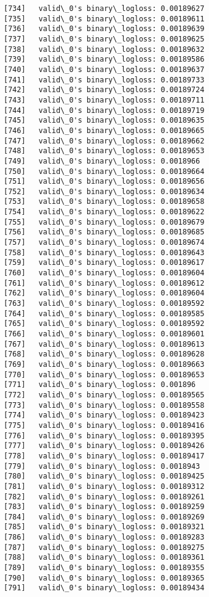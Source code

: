 \documentclass[11pt]{article}
\begin{document}
\begin{Verbatim}[commandchars=\\\{\}]
[734]	valid\_0's binary\_logloss: 0.00189627
[735]	valid\_0's binary\_logloss: 0.00189611
[736]	valid\_0's binary\_logloss: 0.00189639
[737]	valid\_0's binary\_logloss: 0.00189625
[738]	valid\_0's binary\_logloss: 0.00189632
[739]	valid\_0's binary\_logloss: 0.00189586
[740]	valid\_0's binary\_logloss: 0.00189637
[741]	valid\_0's binary\_logloss: 0.00189733
[742]	valid\_0's binary\_logloss: 0.00189724
[743]	valid\_0's binary\_logloss: 0.00189711
[744]	valid\_0's binary\_logloss: 0.00189719
[745]	valid\_0's binary\_logloss: 0.00189635
[746]	valid\_0's binary\_logloss: 0.00189665
[747]	valid\_0's binary\_logloss: 0.00189662
[748]	valid\_0's binary\_logloss: 0.00189653
[749]	valid\_0's binary\_logloss: 0.0018966
[750]	valid\_0's binary\_logloss: 0.00189664
[751]	valid\_0's binary\_logloss: 0.00189656
[752]	valid\_0's binary\_logloss: 0.00189634
[753]	valid\_0's binary\_logloss: 0.00189658
[754]	valid\_0's binary\_logloss: 0.00189622
[755]	valid\_0's binary\_logloss: 0.00189679
[756]	valid\_0's binary\_logloss: 0.00189685
[757]	valid\_0's binary\_logloss: 0.00189674
[758]	valid\_0's binary\_logloss: 0.00189643
[759]	valid\_0's binary\_logloss: 0.00189617
[760]	valid\_0's binary\_logloss: 0.00189604
[761]	valid\_0's binary\_logloss: 0.00189612
[762]	valid\_0's binary\_logloss: 0.00189604
[763]	valid\_0's binary\_logloss: 0.00189592
[764]	valid\_0's binary\_logloss: 0.00189585
[765]	valid\_0's binary\_logloss: 0.00189592
[766]	valid\_0's binary\_logloss: 0.00189601
[767]	valid\_0's binary\_logloss: 0.00189613
[768]	valid\_0's binary\_logloss: 0.00189628
[769]	valid\_0's binary\_logloss: 0.00189663
[770]	valid\_0's binary\_logloss: 0.00189653
[771]	valid\_0's binary\_logloss: 0.001896
[772]	valid\_0's binary\_logloss: 0.00189565
[773]	valid\_0's binary\_logloss: 0.00189558
[774]	valid\_0's binary\_logloss: 0.00189423
[775]	valid\_0's binary\_logloss: 0.00189416
[776]	valid\_0's binary\_logloss: 0.00189395
[777]	valid\_0's binary\_logloss: 0.00189426
[778]	valid\_0's binary\_logloss: 0.00189417
[779]	valid\_0's binary\_logloss: 0.0018943
[780]	valid\_0's binary\_logloss: 0.00189425
[781]	valid\_0's binary\_logloss: 0.00189312
[782]	valid\_0's binary\_logloss: 0.00189261
[783]	valid\_0's binary\_logloss: 0.00189259
[784]	valid\_0's binary\_logloss: 0.00189269
[785]	valid\_0's binary\_logloss: 0.00189321
[786]	valid\_0's binary\_logloss: 0.00189283
[787]	valid\_0's binary\_logloss: 0.00189275
[788]	valid\_0's binary\_logloss: 0.00189361
[789]	valid\_0's binary\_logloss: 0.00189355
[790]	valid\_0's binary\_logloss: 0.00189365
[791]	valid\_0's binary\_logloss: 0.00189434

\end{Verbatim}
\end{document}
